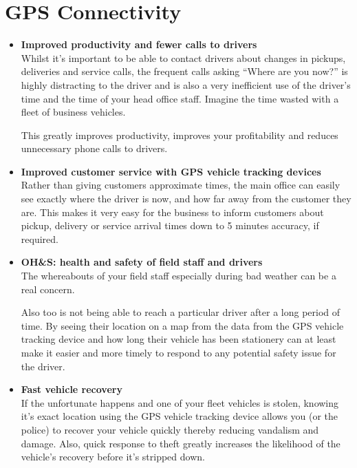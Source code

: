 \section{GPS Connectivity }
\begin{itemize}
	\item \textbf{Improved productivity and fewer calls to drivers}\\
	Whilst it’s important to be able to contact drivers about changes in pickups, deliveries and service calls, the frequent calls asking “Where are you now?” is highly distracting to the driver and is also a very inefficient use of the driver’s time and the time of your head office staff. Imagine the time wasted with a fleet of business vehicles.
	
	This greatly improves productivity, improves your profitability and reduces unnecessary phone calls to drivers.
	
	
	\item \textbf{Improved customer service with GPS vehicle tracking devices}\\
	Rather than giving customers approximate times, the main office can easily see exactly where the driver is now, and how far away from the customer they are.  This makes it very easy for the business to inform customers about pickup, delivery or service arrival times down to 5 minutes accuracy, if required.
	
	
	\item \textbf{OH\&S: health and safety of field staff and drivers}\\
	The whereabouts of your field staff especially during bad weather can be a real concern.
	
	Also too is not being able to reach a particular driver after a long period of time.  By seeing their location on a map from the data from the GPS vehicle tracking device and how long their vehicle has been stationery can at least make it easier and more timely to respond to any potential safety issue for the driver.
	
	
	\item \textbf{Fast vehicle recovery}\\
	If the unfortunate happens and one of your fleet vehicles is stolen, knowing it’s exact location using the GPS vehicle tracking device allows you (or the police) to recover your vehicle quickly thereby reducing vandalism and damage.  Also, quick response to theft greatly increases the likelihood of the vehicle’s recovery before it’s stripped down.
	

\end{itemize}
